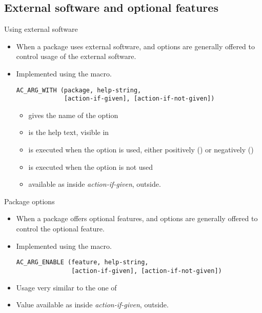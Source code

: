 \subsection{External software and optional features}

\begin{frame}[fragile]{Using external software}
  \begin{itemize}
  \item When a package uses external software,
     and 
    options are generally offered to control usage of the external
    software.
  \item Implemented using the  macro.
    \begin{block}{}
\begin{verbatim}
AC_ARG_WITH (package, help-string,
             [action-if-given], [action-if-not-given])
\end{verbatim}
    \end{block}
    \begin{itemize}
    \item {} gives the name of the option
    \item {} is the help text, visible in
    \item {} is executed when the option is used,
      either positively () or negatively ()
    \item {} is executed when the option is not
      used
    \item {} available as  inside {\em
        action-if-given},  outside.
    \end{itemize}
  \end{itemize}
\end{frame}

\begin{frame}[fragile]{Package options}

  \begin{itemize}

  \item When a package offers optional features,
     and  options
    are generally offered to control the optional feature.
  \item Implemented using the  macro.
\begin{block}{}
\begin{verbatim}
AC_ARG_ENABLE (feature, help-string,
               [action-if-given], [action-if-not-given])
\end{verbatim}
\end{block}
\item Usage very similar to the one of 
\item Value available as  inside {\em
    action-if-given},  outside.
\end{itemize}

\end{frame}

